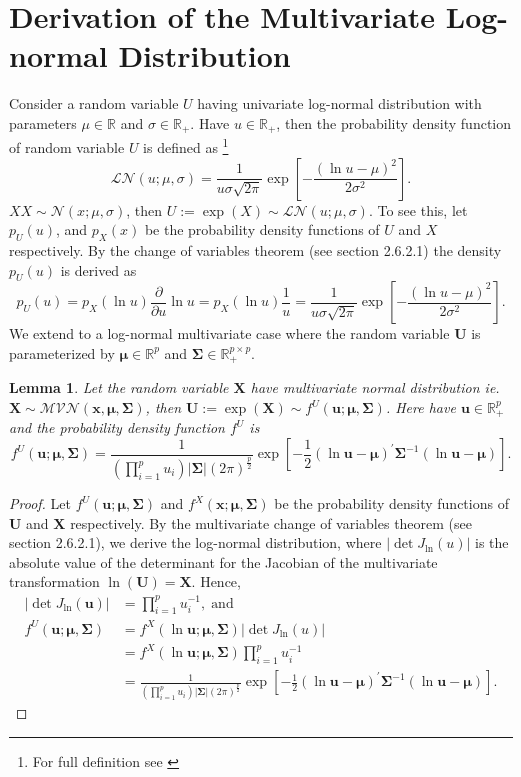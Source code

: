 \documentclass[12pt,letterpaper]{article}
\numberwithin{equation}{section}
\numberwithin{equation}{section}
\numberwithin{equation}{section}
\newtheorem{lemma}[theorem]{Lemma}
\begin{document}
\section{Derivation of the Multivariate Log-normal Distribution }
Consider a random variable $U$ having univariate log-normal distribution with parameters $\mu \in \mathbb{R}$ and $\sigma \in \mathbb{R}_+ $. Have $u \in \mathbb{R}_+$, then the probability density function of random variable $U$ is defined as \footnote{For full definition see \cite{johnson1995continuous}}
$$\mathcal{LN}(u; \mu, \sigma) = \frac{1}{u\sigma\sqrt{2\pi}}\exp\left[-\frac{(\ln u - \mu)^2}{2\sigma^2}	\right].$$
$X$$ X \sim \mathcal{N}(x; \mu, \sigma) $, then $U := \exp{(X)}\sim \mathcal{LN}(u; \mu, \sigma) $.
To see this, let $p_U(u)$, and $ p_X(x) $ be the probability density functions of $U$ and $X$ respectively. By the change of variables theorem (see \cite{murphy2012machine} section 2.6.2.1) the density $p_U(u)$ is derived as
$$p_U(u) = p_X(\ln u )\frac{\partial}{\partial u} \ln u  =  p_X(\ln u ) \frac{1}{u} =  \frac{1}{u\sigma\sqrt{2\pi}}\exp\left[-\frac{(\ln u - \mu)^2}{2\sigma^2}	\right].$$\newline
 We extend to a log-normal multivariate case where the random variable $\bm{U} $ is parameterized by $ \bm{\mu} \in \mathbb{R}^p$ and $\bm{\Sigma} \in  \mathbb{R}_{+}^{p \times p} \label{changeVarUni} $.
\begin{lemma}
Let the random variable $\bm{X}$ have multivariate normal distribution ie. $\bm{X} \sim \mathcal{MVN}(\bm{x}, \bm{\mu},\bm{\Sigma}) $, then $\bm{U} := \exp(\bm{X} ) \sim  f^U(\bm{u}; \bm{\mu } , \bm{\Sigma} )$. Here
have $\bm{u} \in \mathbb{R}_{+}^p $ and the probability density function $f^U$ is
$$ f^U(\bm{u}; \bm{\mu } , \bm{\Sigma} )= \frac{1}{(\prod_{i=1}^{p}u_{i})| \bm{\Sigma} |(2 \pi)^{\frac{p}{2}}}   \exp\left[-\frac{1}{2}(\ln \bm{u} -\bm{\mu})^{'}  \bm{\Sigma}^{-1}(\ln \bm{u} -\bm{\mu})\right].  $$
\end{lemma}
\begin{proof}
Let $f^U(\bm{u}; \bm{\mu},\bm{\Sigma})$ and $f^X(\bm{x}; \bm{\mu},\bm{\Sigma})$ be the probability density functions of $\bm{U}$ and $\bm{X}$ respectively. By the multivariate change of variables theorem (see \cite{murphy2012machine} section 2.6.2.1), we derive the log-normal distribution, where $ | \det J_{\ln} (u) | $ is the absolute value of the determinant for the Jacobian of the multivariate transformation $\ln(\bm{U}) = \bm{X} $. Hence,
\begin{align*}
 | \det J_{\ln} (\bm{u}) | & = \prod_{i=1}^p u_i^{-1}, \; \text{and} \; \\
   f^U(\bm{u}; \bm{\mu},\bm{\Sigma})  & =  f^X(\ln \bm{u}; \bm{\mu},\bm{\Sigma})  | \det J_{\ln} (u) | \\
  & = f^X(\ln \bm{u}; \bm{\mu},\bm{\Sigma})\prod_{i=1}^p u_i^{-1} \\
  & =  \frac{1}{(\prod_{i=1}^{p}u_{i})| \bm{\Sigma} |(2 \pi)^{\frac{p}{2}}}   \exp\left[-\frac{1}{2}(\ln \bm{u} -\bm{\mu})^{'}  \bm{\Sigma}^{-1}(\ln \bm{u} -\bm{\mu})\right].
  \end{align*}
\end{proof}
\end{document}
